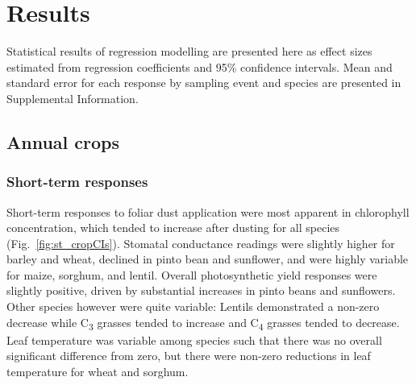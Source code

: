 \documentclass{svjour3}
\begin{document}
\section{Results} 

Statistical results of regression modelling are presented here as effect sizes estimated from regression coefficients and 95\% confidence intervals. 
Mean and standard error for each response by sampling event and species are presented in Supplemental Information. 

\subsection{Annual crops}

\subsubsection{Short-term responses}

Short-term responses to foliar dust application were most apparent in chlorophyll concentration, which tended to increase after dusting for all species (Fig.~\ref{fig:st_cropCIs}). 
Stomatal conductance readings were slightly higher for barley and wheat, declined in pinto bean and sunflower, and were highly variable for maize, sorghum, and lentil. 
Overall photosynthetic yield responses were slightly positive, driven by substantial increases in pinto beans and sunflowers. 
Other species however were quite variable: Lentils demonstrated a non-zero decrease while C\textsubscript{3} grasses tended to increase and C\textsubscript{4} grasses tended to decrease.
Leaf temperature was variable among species such that there was no overall significant difference from zero, but there were non-zero reductions in leaf temperature for wheat and sorghum.  
\end{document}

